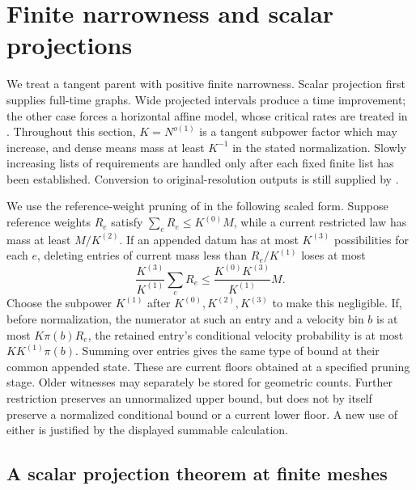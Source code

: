 \section{Finite narrowness and scalar projections}
\label{sec:finite-narrowness}
We treat a tangent parent with positive finite narrowness.  Scalar
projection first supplies full-time graphs.  Wide projected intervals
produce a time improvement; the other case forces a horizontal affine
model, whose critical rates are treated in .
Throughout this section, \(K=N^{o(1)}\) is a tangent subpower factor
which may increase, and dense means mass at least \(K^{-1}\) in the
stated normalization.  Slowly increasing lists of requirements are
handled only after each fixed finite list has been established.
Conversion to original-resolution outputs is still supplied by
.


\begin{remark}
\label{a06:summable-pruning}
We use the reference-weight pruning of
 in the following scaled form.
Suppose reference weights \(R_e\) satisfy
\(\sum_eR_e\leq K^{(0)} M\), while a current restricted law has
mass at least \(M/K^{(2)}\).  If an appended datum has at most
\(K^{(3)}\) possibilities for each \(e\), deleting entries of
current mass less than \(R_e/K^{(1)}\) loses at most
\[
 \frac{K^{(3)}}{K^{(1)}}\sum_eR_e
 \leq \frac{K^{(0)}K^{(3)}}{K^{(1)}}M .
\]
Choose the subpower \(K^{(1)}\) after \(K^{(0)},K^{(2)},K^{(3)}\) to make this
negligible.  If, before normalization, the numerator at such an
entry and a velocity bin \(b\) is at most \(K\pi(b)R_e\), the
retained entry's conditional velocity probability is at most
\(KK^{(1)}\pi(b)\).  Summing over entries gives the same type of
bound at their common appended state.
These are current floors obtained at a specified pruning stage.
Older witnesses may separately be stored for geometric counts.
Further restriction preserves an unnormalized upper bound, but
does not by itself preserve a normalized conditional bound or a
current lower floor.  A new use of either is justified by the
displayed summable calculation.
\end{remark}


\subsection{A scalar projection theorem at finite meshes}

